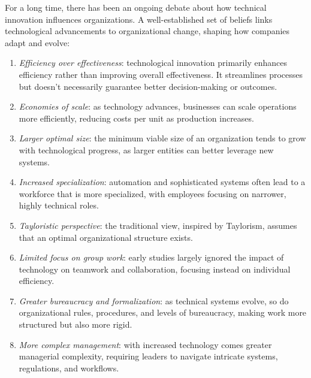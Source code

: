 \noindent For a long time, there has been an ongoing debate about how technical innovation influences organizations. 
A well-established set of beliefs links technological advancements to organizational change, shaping how companies adapt and evolve:
\begin{enumerate}
    \item \textit{Efficiency over effectiveness}: technological innovation primarily enhances efficiency rather than improving overall effectiveness. 
        It streamlines processes but doesn't necessarily guarantee better decision-making or outcomes.
    \item \textit{Economies of scale}: as technology advances, businesses can scale operations more efficiently, reducing costs per unit as production increases.
    \item \textit{Larger optimal size}: the minimum viable size of an organization tends to grow with technological progress, as larger entities can better leverage new systems.
    \item \textit{Increased specialization}: automation and sophisticated systems often lead to a workforce that is more specialized, with employees focusing on narrower, highly technical roles.
    \item \textit{Tayloristic perspective}: the traditional view, inspired by Taylorism, assumes that an optimal organizational structure exists.
    \item \textit{Limited focus on group work}: early studies largely ignored the impact of technology on teamwork and collaboration, focusing instead on individual efficiency.
    \item \textit{Greater bureaucracy and formalization}: as technical systems evolve, so do organizational rules, procedures, and levels of bureaucracy, making work more structured but also more rigid.
    \item \textit{More complex management}: with increased technology comes greater managerial complexity, requiring leaders to navigate intricate systems, regulations, and workflows.
\end{enumerate}